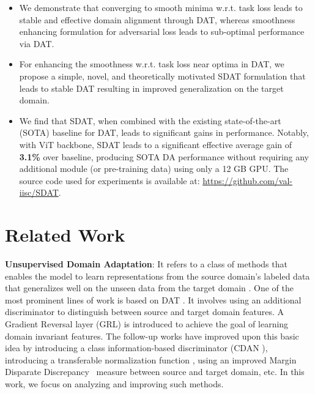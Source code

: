 \documentclass[table,dvipsnames]{article}
\theoremstyle{plain}
\theoremstyle{definition}
\theoremstyle{remark}
\begin{document}
\begin{itemize}
\item We demonstrate that converging to smooth minima w.r.t. task loss leads to stable and effective domain alignment through DAT, whereas smoothness enhancing formulation for adversarial loss leads to sub-optimal performance via DAT.
\item For enhancing the smoothness w.r.t. task loss near optima in DAT, we propose a simple, novel, and theoretically motivated SDAT formulation that leads to stable DAT resulting in improved generalization on the target domain. 
\item We find that SDAT, when combined with the existing state-of-the-art (SOTA) baseline for DAT, leads to significant gains in performance. Notably, with ViT backbone, SDAT leads to a significant effective average gain of \textbf{3.1\%} over baseline, producing SOTA DA performance without requiring any additional module (or pre-training data) using only a 12 GB GPU. The source code used for experiments is available at: \url{https://github.com/val-iisc/SDAT}.
\end{itemize}

\section{Related Work}
{ \textbf{Unsupervised Domain Adaptation}: It refers to a class of methods that enables the model to learn representations from the source domain's labeled data that generalizes well on the unseen data from the target domain \citep{long2018conditional, acuna2021f, zhang2019bridging, Kundu_2021_ICCV, Kundu_2020_CVPR}. One of the most prominent lines of work is based on DAT \citep{ganin2015unsupervised}. 
It involves using an additional discriminator to distinguish between source and target domain features. A Gradient Reversal layer (GRL) is introduced to achieve the goal of learning domain invariant features. The follow-up works have improved upon this basic idea by introducing a class information-based discriminator (CDAN \citep{long2018conditional}), introducing a transferable normalization function \citep{wang2019transferable}, using an improved Margin Disparate Discrepancy~\cite{zhang2019bridging} measure between source and target domain, etc. In this work, we focus on analyzing and improving such methods.}\\
\end{document}
